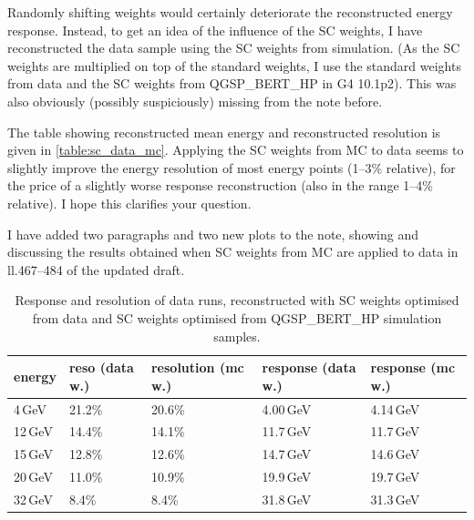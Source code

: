 \documentclass[twoside,a4paper,12pt]{article}
\begin{document}
Randomly shifting weights would certainly deteriorate the reconstructed energy response. Instead, to get an idea of the influence of the SC weights, I have reconstructed the data sample using the SC weights from simulation. (As the SC weights are multiplied on top of the standard weights, I use the standard weights from data and the SC weights from QGSP\_BERT\_HP in G4 10.1p2). This was also obviously (possibly suspiciously) missing from the note before.

 The table showing reconstructed mean energy and reconstructed resolution is given in \autoref{table:sc_data_mc}. Applying the SC weights from MC to data seems to slightly improve the energy resolution of most energy points (1--3\% relative), for the price of a slightly worse response reconstruction (also in the range 1--4\% relative). I hope this clarifies your question.

I have added two paragraphs and two new plots to the note, showing and discussing the results obtained when SC weights from MC are applied to data in ll.467--484 of the updated draft.
\begin{table}[htbp]
\begin{center}
\caption{Response and resolution of data runs, reconstructed with SC weights optimised from data and SC weights optimised from QGSP\_BERT\_HP simulation samples.}
\label{table:sc_data_mc}
\begin{tabular}{lllll}
energy 	&reso (data w.)	&resolution (mc w.)	&response (data w.)	&response (mc w.) \\\hline
4\,GeV		&21.2\%				& 20.6\% 		&	4.00\,GeV	& 4.14\,GeV	\\
12\,GeV		&14.4\%				& 14.1\% 		&	11.7\,GeV	& 11.7\,GeV	\\
15\,GeV		&12.8\%				& 12.6\% 		&	14.7\,GeV	& 14.6\,GeV	\\
20\,GeV		&11.0\%				& 10.9\% 		&	19.9\,GeV	& 19.7\,GeV	\\
32\,GeV		&8.4\%				& 8.4\% 		&	31.8\,GeV	& 31.3\,GeV	\\
\end{tabular}
\end{center}
\end{table}
\end{document}
